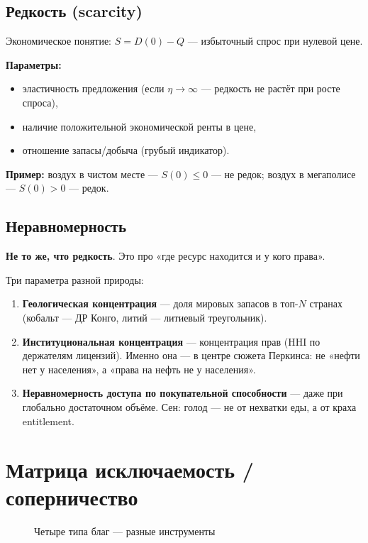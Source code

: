 \documentclass[12pt]{article}
\begin{document}
\subsection{Редкость (scarcity)}
Экономическое понятие: $S = D(0) - Q$ — избыточный спрос при нулевой цене.

\textbf{Параметры:}
\begin{itemize}
\item эластичность предложения (если $\eta \to \infty$ — редкость не растёт при росте спроса),
\item наличие положительной экономической ренты в цене,
\item отношение запасы/добыча (грубый индикатор).
\end{itemize}

\textbf{Пример:} воздух в чистом месте — $S(0) \le 0$ — не редок; воздух в мегаполисе — $S(0) > 0$ — редок.

\subsection{Неравномерность}
\textbf{Не то же, что редкость}. Это про «где ресурс находится и у кого права».

Три параметра разной природы:
\begin{enumerate}
\item \textbf{Геологическая концентрация} — доля мировых запасов в топ-$N$ странах (кобальт — ДР Конго, литий — литиевый треугольник).
\item \textbf{Институциональная концентрация} — концентрация прав (HHI по держателям лицензий). Именно она — в центре сюжета Перкинса: не «нефти нет у населения», а «права на нефть не у населения».
\item \textbf{Неравномерность доступа по покупательной способности} — даже при глобально достаточном объёме. Сен: голод — не от нехватки еды, а от краха entitlement.
\end{enumerate}

\section{Матрица исключаемость / соперничество}

\begin{figure}[h]
\centering
{}
\caption{Четыре типа благ — разные инструменты}
\end{figure}
\end{document}
